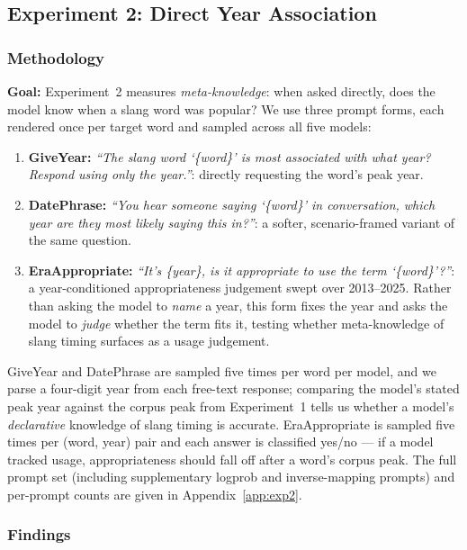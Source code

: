 \documentclass[11pt]{article}
\begin{document}
\subsection{Experiment 2: Direct Year Association}%
\label{sec:exp2}

\subsubsection{Methodology}%
\label{sec:exp2-method}

\textbf{Goal:} Experiment~2 measures \textit{meta-knowledge}: when asked directly, does the model know when a slang word was popular? 
We use three prompt forms, each rendered once per target word and sampled across all five models:
\begin{enumerate}
  \item \textbf{GiveYear:} \textit{``The slang word `\{word\}' is most associated with what year? Respond using only the year.''}: directly requesting the word's peak year. %
  \item \textbf{DatePhrase:} \textit{``You hear someone saying `\{word\}' in conversation, which year are they most likely saying this in?''}: a softer, scenario-framed variant of the same question. %
  \item \textbf{EraAppropriate:} \textit{``It's \{year\}, is it appropriate to use the term `\{word\}'?''}: a year-conditioned appropriateness judgement swept over 2013--2025. Rather than asking the model to \emph{name} a year, this form fixes the year and asks the model to \emph{judge} whether the term fits it, testing whether meta-knowledge of slang timing surfaces as a usage judgement. %
\end{enumerate}

GiveYear and DatePhrase are sampled five times per word per model, and we parse a four-digit year from each free-text response; comparing the model's stated peak year against the corpus peak from Experiment~1 tells us whether a model's \textit{declarative} knowledge of slang timing is accurate. EraAppropriate is sampled five times per (word, year) pair and each answer is classified yes/no --- if a model tracked usage, appropriateness should fall off after a word's corpus peak. The full prompt set (including supplementary logprob and inverse-mapping prompts) and per-prompt counts are given in Appendix~\ref{app:exp2}.

\subsubsection{Findings}
\end{document}
